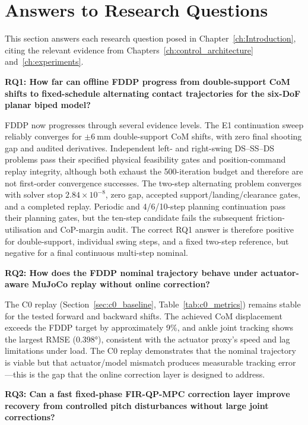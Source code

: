 \documentclass[12pt,a4paper]{report}
\begin{document}
\section{Answers to Research Questions}
 
This section answers each research question posed in Chapter~\ref{ch:Introduction}, citing the relevant evidence from Chapters~\ref{ch:control_architecture} and~\ref{ch:experiments}.
 
\noindent\textbf{RQ1: How far can offline FDDP progress from double-support CoM shifts to fixed-schedule alternating contact trajectories for the six-DoF planar biped model?}
 
FDDP now progresses through several evidence levels. The E1 continuation sweep reliably converges for $\pm\SI{6}{\milli\metre}$ double-support CoM shifts, with zero final shooting gap and audited derivatives. Independent left- and right-swing DS--SS--DS problems pass their specified physical feasibility gates and position-command replay integrity, although both exhaust the 500-iteration budget and therefore are not first-order convergence successes. The two-step alternating problem converges with solver stop $2.84\times10^{-8}$, zero gap, accepted support/landing/clearance gates, and a completed replay. Periodic and 4/6/10-step planning continuation pass their planning gates, but the ten-step candidate fails the subsequent friction-utilisation and CoP-margin audit. The correct RQ1 answer is therefore positive for double-support, individual swing steps, and a fixed two-step reference, but negative for a final continuous multi-step nominal.
 
\noindent\textbf{RQ2: How does the FDDP nominal trajectory behave under actuator-aware MuJoCo replay without online correction?}
 
The C0 replay (Section~\ref{sec:c0_baseline}, Table~\ref{tab:c0_metrics}) remains stable for the tested forward and backward shifts. The achieved CoM displacement exceeds the FDDP target by approximately 9\%, and ankle joint tracking shows the largest RMSE ($\ang{0.398}$), consistent with the actuator proxy's speed and lag limitations under load. The C0 replay demonstrates that the nominal trajectory is viable but that actuator/model mismatch produces measurable tracking error---this is the gap that the online correction layer is designed to address.
 
\noindent\textbf{RQ3: Can a fast fixed-phase FIR-QP-MPC correction layer improve recovery from controlled pitch disturbances without large joint corrections?}
 
\end{document}
